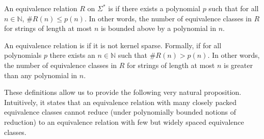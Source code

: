 \begin{definition}
  An equivalence relation $R$ on $\Sigma^*$ is  if there exists a polynomial $p$ such that for all $n\in\mathbb{N}$, $\#R(n)\leq p(n)$.
  In other words, the number of equivalence classes in $R$ for strings of length at most $n$ is bounded above by a polynomial in $n$.

  An equivalence relation is  if it is not kernel sparse.
  Formally, if for all polynomials $p$ there exists an $n\in\mathbb{N}$ such that $\#R(n)>p(n)$.
  In other words, the number of equivalence classes in $R$ for strings of length at most $n$ is greater than any polynomial in $n$.
\end{definition}

These definitions allow us to provide the following very natural proposition.
Intuitively, it states that an equivalence relation with many closely packed equivalence classes cannot reduce (under polynomially bounded notions of reduction) to an equivalence relation with few but widely spaced equivalence classes.

